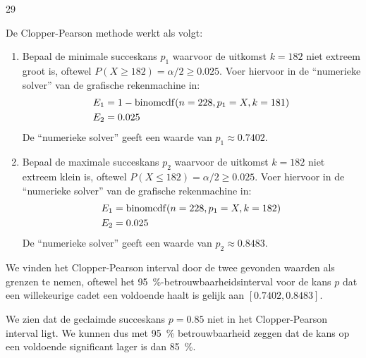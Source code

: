 \begin{question}{29}
{        De Clopper-Pearson methode werkt als volgt:
        \begin{enumerate}
            \item Bepaal de minimale succeskans $p_1$ waarvoor de uitkomst $k = 182$ niet extreem groot is, oftewel $P(X \geq 182) = \alpha/2 \geq 0.025$.
            Voer hiervoor in de \enquote{numerieke solver} van de grafische rekenmachine in:
            \begin{align*}
                E_1 &= 1 - \operatorname{binomcdf}(n=228, p_1=X, k=181) \\
                E_2 &= 0.025 
            \end{align*}
            De \enquote{numerieke solver} geeft een waarde van $p_1 \approx 0.7402$.
            \item Bepaal de maximale succeskans $p_2$ waarvoor de uitkomst $k = 182$ niet extreem klein is, oftewel $P(X \leq 182) = \alpha/2 \geq 0.025$.
            Voer hiervoor in de \enquote{numerieke solver} van de grafische rekenmachine in:
            \begin{align*}
                E_1 &= \operatorname{binomcdf}(n=228, p_1=X, k=182) \\
                E_2 &= 0.025 
            \end{align*}
            De \enquote{numerieke solver} geeft een waarde van $p_2 \approx 0.8483$.
        \end{enumerate}
        We vinden het Clopper-Pearson interval door de twee gevonden waarden als grenzen te nemen,
        oftewel het \SI{95}{\percent}-betrouwbaarheidsinterval voor de kans $p$ dat een willekeurige cadet een voldoende haalt is gelijk aan $[0.7402, 0.8483]$. 

        We zien dat de geclaimde succeskans $p = 0.85$ niet in het Clopper-Pearson interval ligt. 
        We kunnen dus met \SI{95}{\percent} betrouwbaarheid zeggen dat de kans op een voldoende significant lager is dan \SI{85}{\percent}.
    }
\end{question}